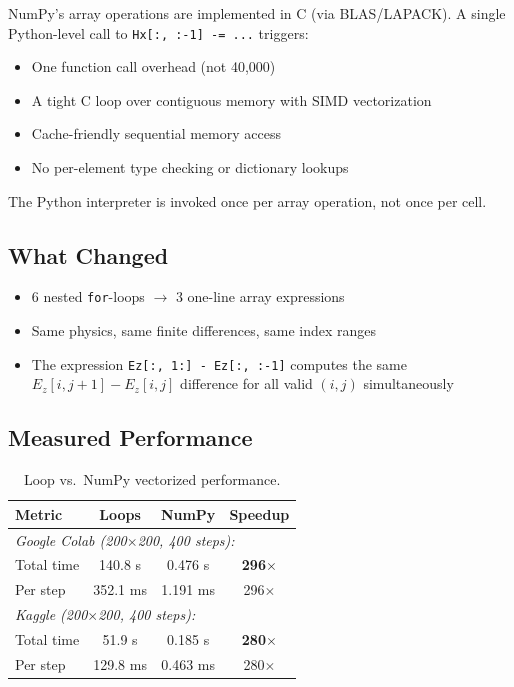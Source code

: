 \documentclass[11pt,a4paper]{article}
\begin{document}
\begin{tcolorbox}[colback=green!3, colframe=okgreen, title=\textbf{Fix \#1: Eliminate interpreter overhead}]
NumPy's array operations are implemented in C (via BLAS/LAPACK). A single Python-level call to \texttt{Hx[:, :-1] -= ...} triggers:
\begin{itemize}[nosep]
    \item One function call overhead (not 40,000)
    \item A tight C loop over contiguous memory with SIMD vectorization
    \item Cache-friendly sequential memory access
    \item No per-element type checking or dictionary lookups
\end{itemize}
The Python interpreter is invoked once per array operation, not once per cell.
\end{tcolorbox}

\subsection{What Changed}

\begin{itemize}[nosep]
    \item 6 nested \texttt{for}-loops $\to$ 3 one-line array expressions
    \item Same physics, same finite differences, same index ranges
    \item The expression \texttt{Ez[:, 1:] - Ez[:, :-1]} computes the same $E_z[i,j\!+\!1] - E_z[i,j]$ difference for all valid $(i,j)$ simultaneously
\end{itemize}

\subsection{Measured Performance}

\begin{table}[H]
\centering
\begin{tabular}{@{}lccc@{}}
\toprule
\textbf{Metric} & \textbf{Loops} & \textbf{NumPy} & \textbf{Speedup} \\
\midrule
\multicolumn{4}{l}{\textit{Google Colab (200$\times$200, 400 steps):}} \\
Total time & 140.8 s & 0.476 s & \textbf{296$\times$} \\
Per step & 352.1 ms & 1.191 ms & 296$\times$ \\
\midrule
\multicolumn{4}{l}{\textit{Kaggle (200$\times$200, 400 steps):}} \\
Total time & 51.9 s & 0.185 s & \textbf{280$\times$} \\
Per step & 129.8 ms & 0.463 ms & 280$\times$ \\
\bottomrule
\end{tabular}
\caption{Loop vs.\ NumPy vectorized performance.}
\end{table}
\end{document}
